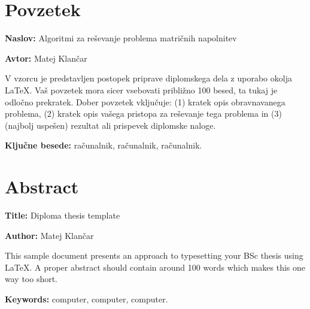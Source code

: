 \documentclass[a4paper,12pt,openright]{book}
\newcommand{\ttitle}{Algoritmi za reševanje problema matričnih napolnitev}
\newcommand{\ttitleEn}{Diploma thesis template}
\newcommand{\tauthor}{Matej Klančar}
\newcommand{\tkeywords}{računalnik, računalnik, računalnik}
\newcommand{\tkeywordsEn}{computer, computer, computer}
\newcommand{\clearemptydoublepage}{\newpage{\pagestyle{empty}\cleardoublepage}}
\begin{document}
\clearemptydoublepage

{}
\chapter*{Povzetek}

\noindent\textbf{Naslov:} \ttitle
\bigskip

\noindent\textbf{Avtor:} \tauthor
\bigskip

\noindent V vzorcu je predstavljen postopek priprave diplomskega dela z uporabo okolja \LaTeX. Vaš povzetek mora sicer vsebovati približno 100 besed, ta tukaj je odločno prekratek.
Dober povzetek vključuje: (1) kratek opis obravnavanega problema, (2) kratek opis vašega pristopa za reševanje tega problema in (3) (najbolj uspešen) rezultat ali prispevek diplomske naloge.

\bigskip

\noindent\textbf{Ključne besede:} \tkeywords.
\clearemptydoublepage

{}
\chapter*{Abstract}

\noindent\textbf{Title:} \ttitleEn
\bigskip

\noindent\textbf{Author:} \tauthor
\bigskip

\noindent This sample document presents an approach to typesetting your BSc thesis using \LaTeX. 
A proper abstract should contain around 100 words which makes this one way too short.
\bigskip

\noindent\textbf{Keywords:} \tkeywordsEn.
\clearemptydoublepage

\mainmatter
\setcounter{page}{1}
\pagestyle{fancy}











\printbibliography
\end{document}
